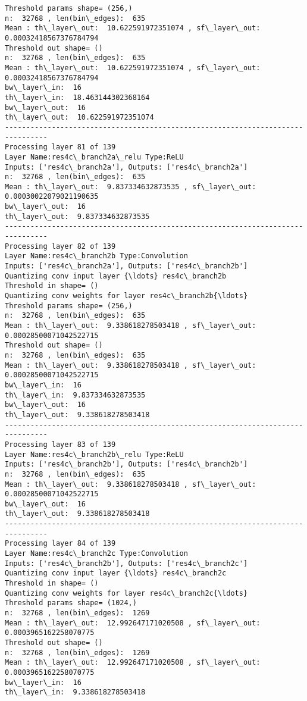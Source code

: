 \documentclass[11pt]{article}
\begin{document}
\begin{Verbatim}[commandchars=\\\{\}]
Threshold params shape= (256,)
n:  32768 , len(bin\_edges):  635
Mean : th\_layer\_out:  10.622591972351074 , sf\_layer\_out:  0.00032418567376784794
Threshold out shape= ()
n:  32768 , len(bin\_edges):  635
Mean : th\_layer\_out:  10.622591972351074 , sf\_layer\_out:  0.00032418567376784794
bw\_layer\_in:  16
th\_layer\_in:  18.463144302368164
bw\_layer\_out:  16
th\_layer\_out:  10.622591972351074
--------------------------------------------------------------------------------
Processing layer 81 of 139
Layer Name:res4c\_branch2a\_relu Type:ReLU
Inputs: ['res4c\_branch2a'], Outputs: ['res4c\_branch2a']
n:  32768 , len(bin\_edges):  635
Mean : th\_layer\_out:  9.837334632873535 , sf\_layer\_out:  0.00030022079021190635
bw\_layer\_out:  16
th\_layer\_out:  9.837334632873535
--------------------------------------------------------------------------------
Processing layer 82 of 139
Layer Name:res4c\_branch2b Type:Convolution
Inputs: ['res4c\_branch2a'], Outputs: ['res4c\_branch2b']
Quantizing conv input layer {\ldots} res4c\_branch2b
Threshold in shape= ()
Quantizing conv weights for layer res4c\_branch2b{\ldots}
Threshold params shape= (256,)
n:  32768 , len(bin\_edges):  635
Mean : th\_layer\_out:  9.338618278503418 , sf\_layer\_out:  0.00028500071042522715
Threshold out shape= ()
n:  32768 , len(bin\_edges):  635
Mean : th\_layer\_out:  9.338618278503418 , sf\_layer\_out:  0.00028500071042522715
bw\_layer\_in:  16
th\_layer\_in:  9.837334632873535
bw\_layer\_out:  16
th\_layer\_out:  9.338618278503418
--------------------------------------------------------------------------------
Processing layer 83 of 139
Layer Name:res4c\_branch2b\_relu Type:ReLU
Inputs: ['res4c\_branch2b'], Outputs: ['res4c\_branch2b']
n:  32768 , len(bin\_edges):  635
Mean : th\_layer\_out:  9.338618278503418 , sf\_layer\_out:  0.00028500071042522715
bw\_layer\_out:  16
th\_layer\_out:  9.338618278503418
--------------------------------------------------------------------------------
Processing layer 84 of 139
Layer Name:res4c\_branch2c Type:Convolution
Inputs: ['res4c\_branch2b'], Outputs: ['res4c\_branch2c']
Quantizing conv input layer {\ldots} res4c\_branch2c
Threshold in shape= ()
Quantizing conv weights for layer res4c\_branch2c{\ldots}
Threshold params shape= (1024,)
n:  32768 , len(bin\_edges):  1269
Mean : th\_layer\_out:  12.992647171020508 , sf\_layer\_out:  0.0003965162258070775
Threshold out shape= ()
n:  32768 , len(bin\_edges):  1269
Mean : th\_layer\_out:  12.992647171020508 , sf\_layer\_out:  0.0003965162258070775
bw\_layer\_in:  16
th\_layer\_in:  9.338618278503418

\end{Verbatim}
\end{document}
